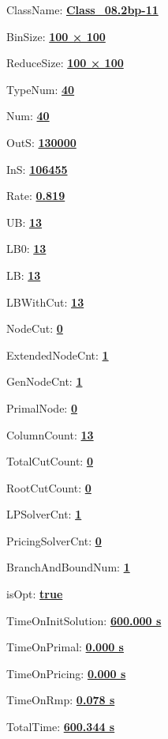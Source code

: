 \documentclass[11pt]{article}
\begin{document}
\pagestyle{empty}


ClassName: \underline{\textbf{Class_08.2bp-11}}
\par
BinSize: \underline{\textbf{100 × 100}}
\par
ReduceSize: \underline{\textbf{100 × 100}}
\par
TypeNum: \underline{\textbf{40}}
\par
Num: \underline{\textbf{40}}
\par
OutS: \underline{\textbf{130000}}
\par
InS: \underline{\textbf{106455}}
\par
Rate: \underline{\textbf{0.819}}
\par
UB: \underline{\textbf{13}}
\par
LB0: \underline{\textbf{13}}
\par
LB: \underline{\textbf{13}}
\par
LBWithCut: \underline{\textbf{13}}
\par
NodeCut: \underline{\textbf{0}}
\par
ExtendedNodeCnt: \underline{\textbf{1}}
\par
GenNodeCnt: \underline{\textbf{1}}
\par
PrimalNode: \underline{\textbf{0}}
\par
ColumnCount: \underline{\textbf{13}}
\par
TotalCutCount: \underline{\textbf{0}}
\par
RootCutCount: \underline{\textbf{0}}
\par
LPSolverCnt: \underline{\textbf{1}}
\par
PricingSolverCnt: \underline{\textbf{0}}
\par
BranchAndBoundNum: \underline{\textbf{1}}
\par
isOpt: \underline{\textbf{true}}
\par
TimeOnInitSolution: \underline{\textbf{600.000 s}}
\par
TimeOnPrimal: \underline{\textbf{0.000 s}}
\par
TimeOnPricing: \underline{\textbf{0.000 s}}
\par
TimeOnRmp: \underline{\textbf{0.078 s}}
\par
TotalTime: \underline{\textbf{600.344 s}}
\par
\newpage


\end{document}
